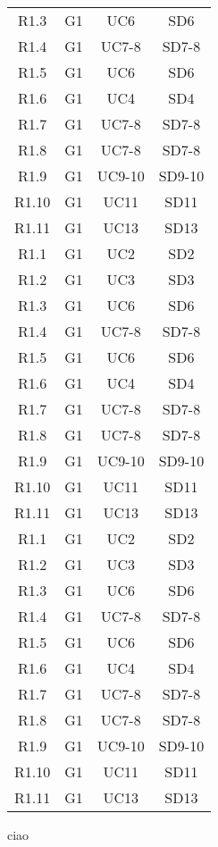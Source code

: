 \begin{longtable}{cccc}
    R1.3 & G1 & UC6    & SD6  \\
    R1.4 & G1 & UC7-8  & SD7-8 \\
    R1.5 & G1 & UC6    & SD6  \\
    R1.6 & G1 & UC4    & SD4  \\
    R1.7 & G1 & UC7-8  & SD7-8 \\
    R1.8 & G1 & UC7-8  & SD7-8 \\
    R1.9 & G1 & UC9-10 & SD9-10 \\
    R1.10 & G1 & UC11  & SD11 \\
    R1.11 & G1 & UC13  & SD13 \\
    R1.1 & G1 & UC2    & SD2  \\
    R1.2 & G1 & UC3    & SD3  \\
    R1.3 & G1 & UC6    & SD6  \\
    R1.4 & G1 & UC7-8  & SD7-8 \\
    R1.5 & G1 & UC6    & SD6  \\
    R1.6 & G1 & UC4    & SD4  \\
    R1.7 & G1 & UC7-8  & SD7-8 \\
    R1.8 & G1 & UC7-8  & SD7-8 \\
    R1.9 & G1 & UC9-10 & SD9-10 \\
    R1.10 & G1 & UC11  & SD11 \\
    R1.11 & G1 & UC13  & SD13 \\
    R1.1 & G1 & UC2    & SD2  \\
    R1.2 & G1 & UC3    & SD3  \\
    R1.3 & G1 & UC6    & SD6  \\
    R1.4 & G1 & UC7-8  & SD7-8 \\
    R1.5 & G1 & UC6    & SD6  \\
    R1.6 & G1 & UC4    & SD4  \\
    R1.7 & G1 & UC7-8  & SD7-8 \\
    R1.8 & G1 & UC7-8  & SD7-8 \\
    R1.9 & G1 & UC9-10 & SD9-10 \\
    R1.10 & G1 & UC11  & SD11 \\
    R1.11 & G1 & UC13  & SD13 \\
    \end{longtable}
    

        ciao
    
    